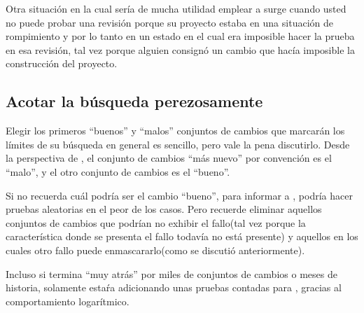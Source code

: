 Otra situación en la cual sería de mucha utilidad emplear a
 surge cuando usted no puede probar una
revisión porque su proyecto estaba en una situación de rompimiento y
por lo tanto en un estado en el cual era imposible hacer la prueba en
esa revisión, tal vez porque alguien consignó un cambio que hacía
imposible la construcción del proyecto.

\subsection{Acotar la búsqueda perezosamente}

Elegir los primeros ``buenos'' y ``malos'' conjuntos de cambios que
marcarán los límites de su búsqueda en general es sencillo, pero vale
la pena discutirlo.  Desde la perspectiva de , el
conjunto de cambios ``más nuevo'' por convención es el ``malo'', y el
otro conjunto de cambios es el ``bueno''.

Si no recuerda cuál podría ser el cambio ``bueno'', para informar a
, podría hacer pruebas aleatorias en el peor de los
casos. Pero recuerde eliminar aquellos conjuntos de cambios que
podrían no exhibir el fallo(tal vez porque la característica donde se
presenta el fallo todavía no está presente) y aquellos en los cuales
otro fallo puede enmascararlo(como se discutió anteriormente).

Incluso si termina ``muy atrás'' por miles de conjuntos de cambios o
meses de historia, solamente estaŕa adicionando unas pruebas contadas
para , gracias al comportamiento logarítmico.

